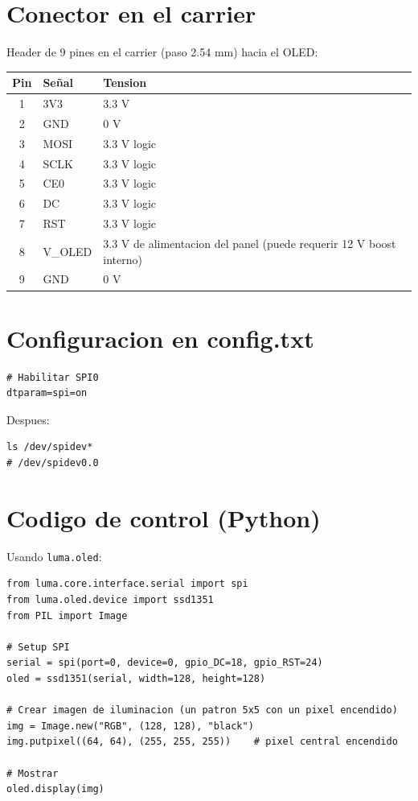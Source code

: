 \documentclass[11pt,a4paper,oneside,openright]{book}
\begin{document}
\section{Conector en el carrier}

Header de 9 pines en el carrier (paso 2.54 mm) hacia el OLED:

\begin{center}
\begin{tabular}{cll}
\toprule
\textbf{Pin} & \textbf{Señal} & \textbf{Tension} \\
\midrule
1 & 3V3       & 3.3 V \\
2 & GND       & 0 V \\
3 & MOSI      & 3.3 V logic \\
4 & SCLK      & 3.3 V logic \\
5 & CE0       & 3.3 V logic \\
6 & DC        & 3.3 V logic \\
7 & RST       & 3.3 V logic \\
8 & V\_OLED   & 3.3 V de alimentacion del panel (puede requerir 12 V boost interno) \\
9 & GND       & 0 V \\
\bottomrule
\end{tabular}
\end{center}

\section{Configuracion en config.txt}

\begin{lstlisting}
# Habilitar SPI0
dtparam=spi=on
\end{lstlisting}

Despues:

\begin{lstlisting}
ls /dev/spidev*
# /dev/spidev0.0
\end{lstlisting}

\section{Codigo de control (Python)}

Usando \texttt{luma.oled}:

\begin{lstlisting}
from luma.core.interface.serial import spi
from luma.oled.device import ssd1351
from PIL import Image

# Setup SPI
serial = spi(port=0, device=0, gpio_DC=18, gpio_RST=24)
oled = ssd1351(serial, width=128, height=128)

# Crear imagen de iluminacion (un patron 5x5 con un pixel encendido)
img = Image.new("RGB", (128, 128), "black")
img.putpixel((64, 64), (255, 255, 255))    # pixel central encendido

# Mostrar
oled.display(img)
\end{lstlisting}
\end{document}
